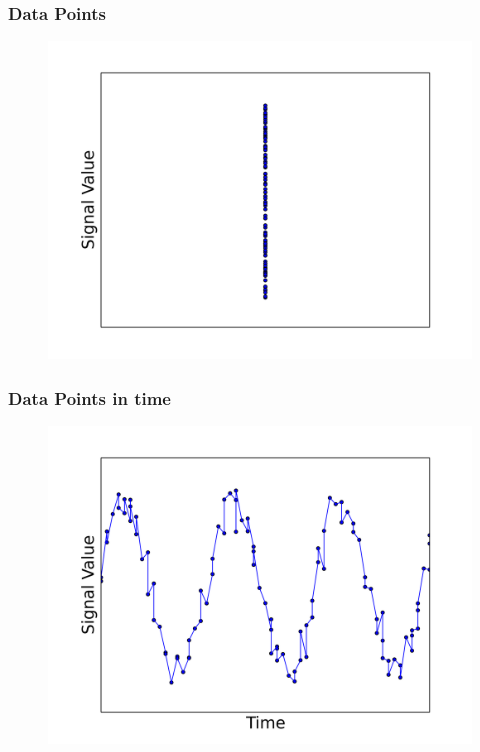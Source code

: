 \documentclass[aspectratio=169]{beamer}
\begin{document}
  \begin{frame}[foot]
    \frametitle{Data Points}
    \begin{figure}
      \includegraphics[height=.95\textheight]{./gfx/feature0.png}
    \end{figure}
  \end{frame}

  \begin{frame}[foot]
    \frametitle{Data Points in time}
    \begin{figure}
      \includegraphics[height=.95\textheight]{./gfx/feature5.png}
    \end{figure}
  \end{frame}
\end{document}
